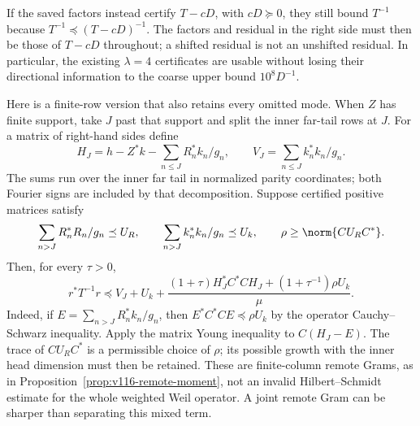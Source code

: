 If the saved factors instead certify $T-cD$, with $cD\succeq0$,
they still bound $T^{-1}$ because
$T^{-1}\preceq(T-cD)^{-1}$. The factors and residual in the
right side must then be those of $T-cD$ throughout; a shifted
residual is not an unshifted residual. In particular, the existing
$\lambda=4$ certificates are usable without losing their directional
information to the coarse upper bound $10^8D^{-1}$.

Here is a finite-row version that also retains every omitted mode.
When $Z$ has finite support, take $J$ past that support and split the inner far-tail rows
at $J$. For a matrix of right-hand sides define
\[
 H_J=h-Z^*k-\sum_{n\le J}R_n^*k_n/g_n,
 \qquad V_J=\sum_{n\le J}k_n^*k_n/g_n.
\]
The sums run over the inner far tail in normalized parity coordinates;
both Fourier signs are included by that decomposition. Suppose certified positive
matrices satisfy
\[
 \sum_{n>J}R_n^*R_n/g_n\preceq U_R,
 \qquad \sum_{n>J}k_n^*k_n/g_n\preceq U_k,
 \qquad \rho\ge\norm{CU_RC^*}.
\]
Then, for every $\tau>0$,
\begin{equation}\label{eq:v120-structured-finite-rows}
 r^*T^{-1}r\preceq V_J+U_k+
 \frac{(1+\tau)H_J^*C^*CH_J+
             (1+\tau^{-1})\rho U_k}{\mu}.
\end{equation}
Indeed, if $E=\sum_{n>J}R_n^*k_n/g_n$, then
$E^*C^*CE\preceq\rho U_k$ by the operator Cauchy--Schwarz
inequality. Apply the matrix Young inequality to $C(H_J-E)$.
The trace of $CU_RC^*$ is a permissible choice of $\rho$;
its possible growth with the inner head dimension must then be
retained. These are finite-column remote Grams, as in
Proposition~\ref{prop:v116-remote-moment}, not an invalid
Hilbert--Schmidt estimate for the whole weighted Weil operator.
A joint remote Gram can be sharper than separating this mixed term.

